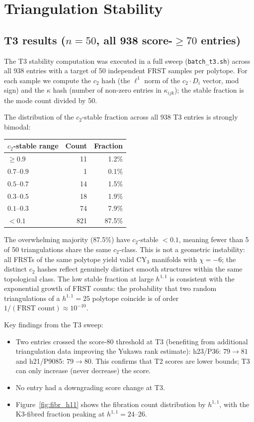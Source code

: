 \documentclass[11pt,a4paper]{article}
\begin{document}
\section{Triangulation Stability}
\label{sec:stability}

\subsection{T3 results ($n=50$, all 938 score-$\geq 70$ entries)}

The T3 stability computation was executed in a full sweep
(\texttt{batch\_t3.sh}) across all 938 entries with a target
of 50 independent FRST samples per polytope.
For each sample we compute the $c_2$ hash (the $\ell^1$ norm
of the $c_2\cdot D_i$ vector, mod sign) and the $\kappa$ hash
(number of non-zero entries in $\kappa_{ijk}$); the stable
fraction is the mode count divided by 50.

The distribution of the $c_2$-stable fraction across all 938
T3 entries is strongly bimodal:

\begin{center}
\small
\begin{tabular}{lrr}
\toprule
$c_2$-stable range & Count & Fraction \\
\midrule
$\geq 0.9$         &  11   & 1.2\% \\
$0.7$--$0.9$       &   1   & 0.1\% \\
$0.5$--$0.7$       &  14   & 1.5\% \\
$0.3$--$0.5$       &  18   & 1.9\% \\
$0.1$--$0.3$       &  74   & 7.9\% \\
$< 0.1$            & 821   & 87.5\% \\
\bottomrule
\end{tabular}
\end{center}

\noindent
The overwhelming majority (87.5\%) have $c_2$-stable $< 0.1$,
meaning fewer than 5 of 50 triangulations share the same
$c_2$-class.
This is not a geometric instability: all FRSTs of the same polytope
yield valid CY$_3$ manifolds with $\chi=-6$; the distinct $c_2$
hashes reflect genuinely distinct smooth structures within the
same topological class.
The low stable fraction at large $h^{1,1}$ is consistent
with the exponential growth of FRST counts: the probability that
two random triangulations of a $h^{1,1}=25$ polytope coincide
is of order $1/(\text{FRST count}) \approx 10^{-10}$.

Key findings from the T3 sweep:
\begin{itemize}[noitemsep]
  \item Two entries crossed the score-80 threshold at T3 (benefiting
    from additional triangulation data improving the Yukawa rank estimate):
    h23/P36: $79\to 81$ and h21/P9085: $79\to 80$.
    This confirms that T2 scores are lower bounds; T3 can only
    increase (never decrease) the score.
  \item No entry had a downgrading score change at T3.
  \item Figure~\ref{fig:fibr_h11} shows the fibration count distribution
    by $h^{1,1}$, with the K3-fibred fraction peaking at $h^{1,1}=24$--26.
\end{itemize}
\end{document}
